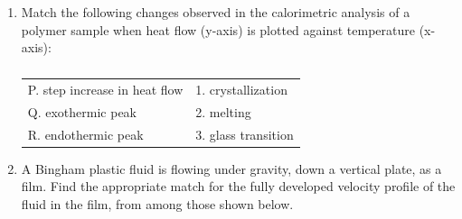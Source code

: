 \documentclass[a4paper,10pt]{article}
\begin{document}
\begin{enumerate}
    \hfill{}
    \begin{enumerate}
    \end{enumerate}

    \item Match the following changes observed in the calorimetric analysis of a polymer sample when heat flow (y-axis) is plotted against temperature (x-axis):
    \begin{table}[h!] \centering \caption*{} \label{tab:q8_polymer}
        \begin{tabular}{ll} \hline
            P. step increase in heat flow & 1. crystallization \\
            Q. exothermic peak & 2. melting \\
            R. endothermic peak & 3. glass transition \\ \hline
        \end{tabular}
    \end{table}
    
    \hfill{}
    \begin{enumerate}
    \end{enumerate}
    
    \item A Bingham plastic fluid is flowing under gravity, down a vertical plate, as a film. Find the appropriate match for the fully developed velocity profile of the fluid in the film, from among those shown below.
    

\end{enumerate}
\end{document}
